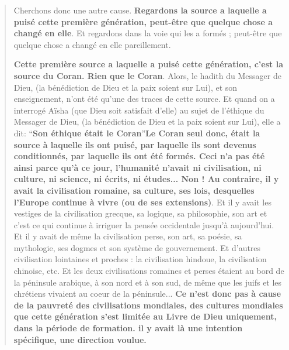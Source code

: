 \begin{quote}
    Cherchons donc une autre cause. \textbf{Regardons la source a laquelle a
puisé cette première génération, peut-être que quelque chose a changé en
elle}. Et regardons dans la voie qui les a formés ; peut-être que
quelque chose a changé en elle pareillement.

\textbf{Cette première source a laquelle a puisé cette génération, c'est
la source du Coran. Rien que le Coran}. Alors, le hadith du Messager de
Dieu, (la bénédiction de Dieu et la paix soient sur Lui), et son
enseignement, n'ont été qu'une des traces de cette source. Et quand on a
interrogé Aïsha (que Dieu soit satisfait d'elle) au sujet de l'éthique
du Messager de Dieu, (la bénédiction de Dieu et la paix soient sur Lui),
elle a dit: ``\textbf{Son éthique était le Coran}''\textbf{Le Coran seul
donc, était la source à laquelle ils ont puisé, par laquelle ils sont
devenus conditionnés, par laquelle ils ont été formés. Ceci n'a pas été
ainsi parce qu'à ce jour, l'humanité n'avait ni civilisation, ni
culture, ni science, ni écrits, ni études... Non ! Au contraire, il y
avait la civilisation romaine, sa culture, ses lois, desquelles l'Europe
continue à vivre (ou de ses extensions)}. Et il y avait les vestiges de
la civilisation grecque, sa logique, sa philosophie, son art et c'est ce
qui continue à irriguer la pensée occidentale jusqu'à aujourd'hui. Et il
y avait de même la civilisation perse, son art, sa poésie, sa
mythologie, ses dogmes et son système de gouvernement. Et d'autres
civilisation lointaines et proches : la civilisation hindoue, la
civilisation chinoise, etc. Et les deux civilisations romaines et perses
étaient au bord de la péninsule arabique, à son nord et à son sud, de
même que les juifs et les chrétiens vivaient au coeur de la péninsule...
\textbf{Ce n'est donc pas à cause de la pauvreté des civilisations
mondiales, des cultures mondiales que cette génération s'est limitée au
Livre de Dieu uniquement, dans la période de formation. il y avait là
une intention spécifique, une direction voulue.}


\end{quote}
